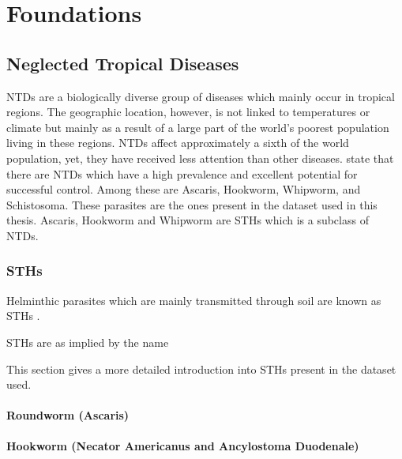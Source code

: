 \chapter{Foundations}
\label{ch:Foundations}

\section{Neglected Tropical Diseases}
\label{sec:Foundations:NTDs}

\ac{NTDs} \cite{feasey2010neglected} are a biologically diverse group of diseases which mainly occur in tropical regions. The geographic location, however, is not linked to temperatures or climate but mainly as a result of a large part of the world's poorest population living in these regions. \ac{NTDs} affect approximately a sixth of the world population, yet, they have received less attention than other diseases. \textcite{feasey2010neglected} state that there are \ac{NTDs} which have a high prevalence and excellent potential for successful control. Among these are Ascaris, Hookworm, Whipworm, and Schistosoma. These parasites are the ones present in the dataset used in this thesis. Ascaris, Hookworm and Whipworm are \ac{STHs} which is a subclass of \ac{NTDs}.

\subsection{\acl{STHs}}
\label{sec:Foundations:NTDs:STHs}

Helminthic parasites which are mainly transmitted through soil are known as \acl{STHs} \cite{feasey2010neglected,jourdan2018soiltransmitted}. 

\ac{STHs} are as implied by the name 


This section gives a more detailed introduction into \ac{STHs} present in the dataset used.




\subsubsection{Roundworm (Ascaris)}
\label{sec:Foundations:NTDs:STHs:Ascaris}

\subsubsection{Hookworm (Necator Americanus and Ancylostoma Duodenale)}
\label{sec:Foundations:NTDs:STHs:Hookworm}

